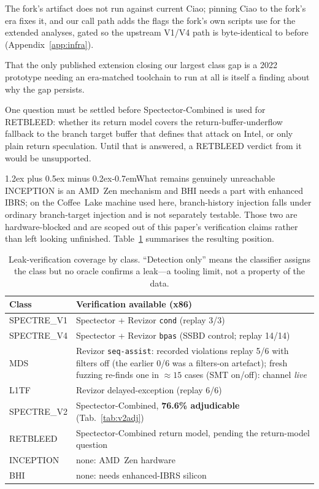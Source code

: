 \documentclass[conference]{IEEEtran}
\makeatletter
\renewcommand\paragraph{\@startsection{paragraph}{4}{\z@}%
  {1.2ex plus 0.5ex minus 0.2ex}{-0.7em}{\normalfont\normalsize\bfseries}}
\makeatother
\begin{document}
The fork's artifact does not run against current Ciao; pinning Ciao to the
fork's era fixes it, and our call path adds the flags the fork's own scripts
use for the extended analyses, gated so the upstream V1/V4 path is
byte-identical to before (Appendix~\ref{app:infra}).

That the only published extension closing our largest class gap is a 2022
prototype needing an era-matched toolchain to run at all is itself a finding
about why the gap persists.

One question must be settled before Spectector-Combined is used for
RETBLEED: whether its
return model covers the return-buffer-underflow fallback to the branch target
buffer that defines that attack on Intel, or only plain return speculation.
Until that is answered, a RETBLEED verdict from it would be unsupported.

\paragraph{What remains genuinely unreachable} INCEPTION is an AMD~Zen
mechanism and BHI needs a part with enhanced IBRS; on the Coffee~Lake machine
used here, branch-history injection falls under ordinary branch-target
injection and is not separately testable. Those two are hardware-blocked and
are scoped out of this paper's verification claims rather than left looking
unfinished. Table~\ref{tab:coverage} summarises the resulting position.

\begin{table}[t]
\centering
\caption{Leak-verification coverage by class. ``Detection only'' means the
  classifier assigns the class but no oracle confirms a leak---a tooling
  limit, not a property of the data.}
\label{tab:coverage}
\footnotesize
\setlength{\tabcolsep}{3pt}
\begin{tabularx}{\columnwidth}{@{}lX@{}}
\toprule
Class & Verification available (x86) \\
\midrule
SPECTRE\_V1 & Spectector + Revizor \texttt{cond} (replay 3/3) \\
SPECTRE\_V4 & Spectector + Revizor \texttt{bpas} (SSBD control; replay 14/14) \\
MDS & Revizor \texttt{seq-assist}: recorded violations replay 5/6 with filters off (the earlier 0/6 was a filters-on artefact); fresh fuzzing re-finds one in ${\approx}15$ cases (SMT on/off): channel \emph{live} \\
L1TF & Revizor delayed-exception (replay 6/6) \\
SPECTRE\_V2 & Spectector-Combined, \textbf{76.6\% adjudicable} (Tab.~\ref{tab:v2adj}) \\
RETBLEED & Spectector-Combined return model, pending the return-model question \\
INCEPTION & none: AMD~Zen hardware \\
BHI & none: needs enhanced-IBRS silicon \\
\bottomrule
\end{tabularx}
\end{table}
\end{document}
